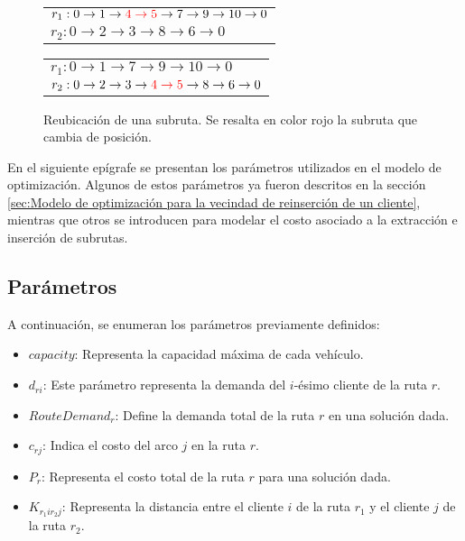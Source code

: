 \documentclass[12pt]{report}
\begin{document}
		\begin{figure}[h!]
			\centering
			\begin{minipage}{0.45\textwidth}
				\begin{tabular}{l}
					$r_1:  0 \rightarrow 1\rightarrow \textcolor{red}{4 \rightarrow 5} \rightarrow 7 \rightarrow 9 \rightarrow 10 \rightarrow  0$\\
					$r_2:  0\rightarrow 2\rightarrow 3\rightarrow 8 \rightarrow 6 \rightarrow  0$\\
				\end{tabular}
			\end{minipage}
			\hfill
			\begin{minipage}{0.45\textwidth}
				\begin{tabular}{l}
					$r_1:  0 \rightarrow 1 \rightarrow 7 \rightarrow 9 \rightarrow 10 \rightarrow 0$\\
					$r_2:  0\rightarrow 2\rightarrow 3 \rightarrow \textcolor{red}{4 \rightarrow 5}\rightarrow 8 \rightarrow 6 \rightarrow 0$\\
				\end{tabular}
			\end{minipage}

			\caption{Reubicación de una subruta. Se resalta en color rojo la subruta que cambia de posición.}
			\label{variable-2}
		\end{figure}


	En el siguiente epígrafe se presentan los parámetros utilizados en el modelo de optimización. Algunos de estos parámetros ya fueron descritos en la sección \ref{sec:Modelo de optimización para la vecindad de reinserción de un cliente}, mientras que otros se introducen para modelar el costo asociado a la extracción e inserción de subrutas.

	\subsection{Parámetros}

	A continuación, se enumeran los parámetros previamente definidos:
	\begin{itemize}
		\item $capacity$: Representa la capacidad máxima de cada vehículo.
		\item $d_{ri}$: Este parámetro representa la demanda del $i$-ésimo cliente de la ruta $r$.
		\item $RouteDemand_r$: Define la demanda total de la ruta $r$ en una solución dada.
		\item $c_{rj}$: Indica el costo del arco $j$ en la ruta $r$.
		\item $P_r$: Representa el costo total de la ruta $r$ para una solución dada.
		\item $K_{r_1ir_2j}$: Representa la distancia entre el cliente $i$ de la ruta $r_1$ y el cliente $j$ de la ruta $r_2$.
	\end{itemize}
\end{document}
